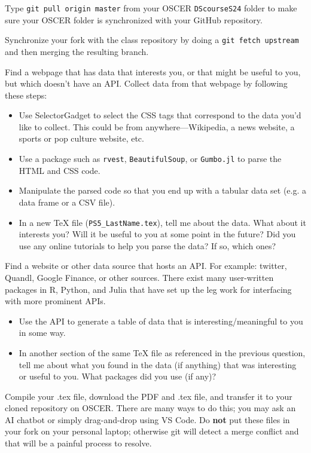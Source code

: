 \documentclass[12pt,english]{exam}
\begin{document}
\begin{questions}
\question Type \texttt{git pull origin master} from your OSCER \texttt{DScourseS24} folder to make sure your OSCER folder is synchronized with your GitHub repository. 

\question Synchronize your fork with the class repository by doing a \texttt{git fetch upstream} and then merging the resulting branch. 

\question Find a webpage that has data that interests you, or that might be useful to you, but which doesn't have an API. Collect data from that webpage by following these steps:
\begin{itemize}
    \item Use SelectorGadget to select the CSS tags that correspond to the data you'd like to collect. This could be from anywhere---Wikipedia, a news website, a sports or pop culture website, etc.
    \item Use a package such as \texttt{rvest}, \texttt{BeautifulSoup}, or \texttt{Gumbo.jl} to parse the HTML and CSS code.
    \item Manipulate the parsed code so that you end up with a tabular data set (e.g. a data frame or a CSV file).
    \item In a new TeX file (\texttt{PS5\_LastName.tex}), tell me about the data. What about it interests you? Will it be useful to you at some point in the future? Did you use any online tutorials to help you parse the data? If so, which ones?
\end{itemize}

\question Find a website or other data source that hosts an API. For example: twitter, Quandl, Google Finance, or other sources. There exist many user-written packages in R, Python, and Julia that have set up the leg work for interfacing with more prominent APIs. 
\begin{itemize}
    \item Use the API to generate a table of data that is interesting/meaningful to you in some way.
    \item In another section of the same TeX file as referenced in the previous question, tell me about what you found in the data (if anything) that was interesting or useful to you. What packages did you use (if any)?
\end{itemize}

\question Compile your .tex file, download the PDF and .tex file, and transfer it to your cloned repository on OSCER. There are many ways to do this;  you may ask an AI chatbot or simply drag-and-drop using VS Code. Do \textbf{not} put these files in your fork on your personal laptop; otherwise git will detect a merge conflict and that will be a painful process to resolve.


\end{questions}
\end{document}
